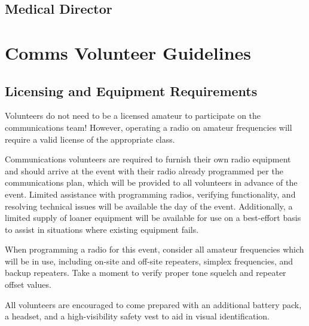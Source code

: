 \documentclass[pdflatex,letterpaper,twoside,12pt]{book}
\begin{document}
\section{Medical Director}


\chapter{Comms Volunteer Guidelines}

\iffalse %
 * You are an event guide and a Professional Communicator, be visible
   and answer questions, help out, go above and beyond 
\fi %

\section{Licensing and Equipment Requirements}

Volunteers do not need to be a licensed amateur to participate on the communications team!  However, operating a radio on amateur frequencies will require a valid license of the appropriate class.

Communications volunteers are required to furnish their own radio equipment and should arrive at the event with their radio already programmed per the communications plan, which will be provided to all volunteers in advance of the event.  Limited assistance with programming radios, verifying functionality, and resolving technical issues will be available the day of the event.  Additionally, a limited supply of loaner equipment will be available for use on a best-effort basis to assist in situations where existing equipment fails.

When programming a radio for this event, consider all amateur frequencies which will be in use, including on-site and off-site repeaters, simplex frequencies, and backup repeaters.  Take a moment to verify proper tone squelch and repeater offset values.

All volunteers are encouraged to come prepared with an additional battery pack, a headset, and a high-visibility safety vest to aid in visual identification.
\end{document}

